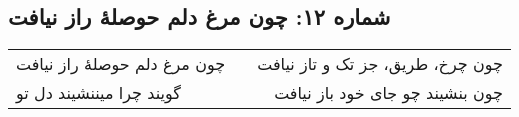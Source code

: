 \begin{center}
\section*{شماره ۱۲: چون مرغ دلم حوصلۀ راز نیافت}
\label{sec:012}
\begin{longtable}{l p{0.5cm} r}
چون مرغ دلم حوصلهٔ راز نیافت
&&
چون چرخ، طریق، جز تک و تاز نیافت
\\
گویند چرا میننشیند دل تو
&&
چون بنشیند چو جای خود باز نیافت
\\
\end{longtable}
\end{center}
